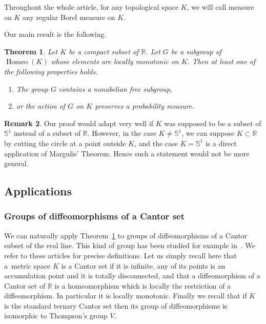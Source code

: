 \documentclass[10pt]{amsart}
\newtheorem{theo}{Theorem}[section]
\theoremstyle{definition}\newtheorem{defi}[theo]{Definition}\newtheorem{rema}[theo]{Remark}\newtheorem{exam}[theo]{Example}\newtheorem{exem}[theo]{Example}\newtheorem{nota}[theo]{Notation}
\DeclareMathOperator{\Homeo}{Homeo}
\newcommand{\bbS}{\mathbb{S}}
\newcommand{\R}{\mathbb{R}}
\newcounter{setofcase}
\newcounter{case}[setofcase]
\begin{document}
Throughout the whole article, for any topological space $K$, we will call measure on $K$ any regular Borel measure on $K$.

Our main result is the following.


\begin{theo}\label{Tits}
Let $K$ be a compact subset of $\R$. Let $G$ be a subgroup of $\Homeo(K)$ whose elements are locally monotonic on $K$. Then at least one of the following properties holds.
\begin{enumerate}
\item\label{theo1.3.1} The group $G$ contains a nonabelian free subgroup,
\item\label{theo1.3.2} or the action of $G$ on $K$ preserves a probability measure.
\end{enumerate}
\end{theo}



\begin{rema}
Our proof would adapt very well if $K$ was supposed to be a subset of $\bbS^1$ instead of a subset of $\R$. However, in the case $K\not=\bbS^1$, we can suppose $K \subset \R$ by cutting the circle at a point outside $K$, and the case $K=\bbS^1$ is a direct application of Margulis' Theorem. Hence such a statement would not be more general.
\end{rema}


\subsection{Applications}

\subsubsection*{Groups of diffeomorphisms of a Cantor set}

We can naturally apply Theorem~\ref{Tits} to groups of diffeomorphisms of a Cantor subset of the real line. This kind of group has been studied for example in~\cite{FN,MM}. We refer to these articles for precise definitions. Let us simply recall here that a~metric space $K$ is a Cantor set if it is infinite, any of its points is an accumulation point and it is totally disconnected, and that a diffeomorphism of a Cantor set of $\R$ is a homeomorphism which is locally the restriction of a diffeomorphism. In particular it is locally monotonic. Finally we recall that if $K$ is the standard ternary Cantor set then its group of diffeomorphisms is isomorphic to Thompson's group $V$.
\end{document}
